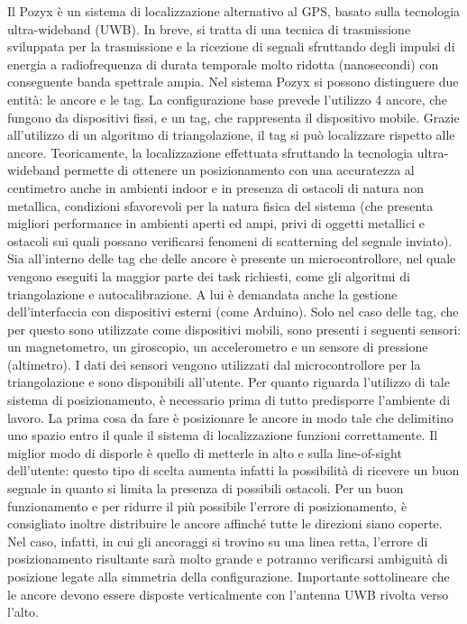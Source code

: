Il Pozyx è un sistema di localizzazione alternativo al GPS, basato sulla tecnologia ultra-wideband
(UWB). In breve, si tratta di una tecnica di trasmissione sviluppata per la trasmissione e la ricezione di segnali 
sfruttando degli impulsi di energia a radiofrequenza di durata temporale molto ridotta (nanosecondi) con conseguente
banda spettrale ampia.
Nel sistema Pozyx si possono distinguere due entità: le ancore e le tag.
La configurazione base prevede l'utilizzo 4 ancore, che fungono da dispositivi fissi, e un tag, che rappresenta il dispositivo mobile.
Grazie all'utilizzo di un algoritmo di triangolazione, il tag si può localizzare rispetto alle ancore. Teoricamente, la localizzazione 
effettuata sfruttando la tecnologia ultra-wideband permette di ottenere un posizionamento con una accuratezza al centimetro anche
in ambienti indoor e in presenza di ostacoli di natura non metallica, condizioni sfavorevoli per la natura fisica del sistema (che presenta 
migliori performance in ambienti aperti ed ampi, privi di oggetti metallici e ostacoli sui quali possano verificarsi fenomeni di scatterning 
del segnale inviato). 
Sia all'interno delle tag che delle ancore è presente un microcontrollore, nel quale vengono eseguiti la maggior parte dei task richiesti,
come gli algoritmi di triangolazione e autocalibrazione. A lui è demandata anche la gestione dell’interfaccia con dispositivi esterni
(come Arduino).
Solo nel caso delle tag, che per questo sono utilizzate come dispositivi mobili, sono presenti i seguenti sensori: un magnetometro, un giroscopio, un
accelerometro e un sensore di pressione (altimetro). I dati dei sensori vengono utilizzati dal microcontrollore
per la triangolazione e sono disponibili all’utente.
Per quanto riguarda l'utilizzo di tale sistema di posizionamento, è necessario prima di tutto predisporre l'ambiente di lavoro.
La prima cosa da fare è posizionare le ancore in modo tale che delimitino uno spazio entro il quale il sistema di localizzazione
funzioni correttamente. Il miglior modo di disporle è quello di metterle in alto e sulla line-of-sight dell’utente: questo tipo di scelta
aumenta infatti la possibilità di ricevere un buon segnale in quanto si limita la presenza di possibili ostacoli. 
Per un buon funzionamento e per ridurre il più possibile l'errore di posizionamento, è consigliato inoltre distribuire le ancore affinché tutte le 
direzioni siano coperte.
Nel caso, infatti, in cui gli ancoraggi si trovino su una linea retta, l'errore di posizionamento risultante sarà molto grande e potranno
verificarsi ambiguità di posizione legate alla simmetria della configurazione.
Importante sottolineare che le ancore devono essere disposte verticalmente con l’antenna UWB rivolta verso l’alto.


